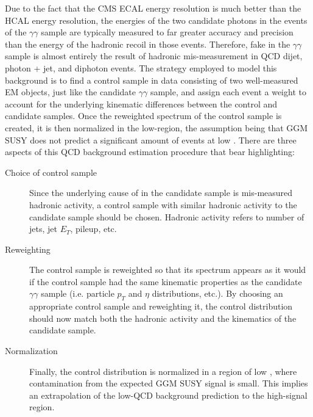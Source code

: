 \documentclass[dissertation_bw.tex]{subfiles}
\begin{document}
Due to the fact that the CMS ECAL energy resolution is much better than the HCAL energy resolution, the energies of the two candidate photons in the events of the $\gamma\gamma$ sample are typically measured to far greater accuracy and precision than the energy of the hadronic recoil in those events.  Therefore, fake \MET in the $\gamma\gamma$ sample is almost entirely the result of hadronic mis-measurement in QCD dijet, photon + jet, and diphoton events.  The strategy employed to model this background is to find a control sample in data consisting of two well-measured EM objects, just like the candidate $\gamma\gamma$ sample, and assign each event a weight to account for the underlying kinematic differences between the control and candidate samples.  Once the reweighted \MET spectrum of the control sample is created, it is then normalized in the low-\MET region, the assumption being that GGM SUSY does not predict a significant amount of events at low \MET.  There are three aspects of this QCD background estimation procedure that bear highlighting:

\begin{description}
\item[Choice of control sample] Since the underlying cause of \MET in the candidate sample is mis-measured hadronic activity, a control sample with similar hadronic activity to the candidate sample should be chosen.  Hadronic activity refers to number of jets, jet $E_{T}$, pileup, etc.
\item[Reweighting] The control sample is reweighted so that its \MET spectrum appears as it would if the control sample had the same kinematic properties as the candidate $\gamma\gamma$ sample (i.e. particle $p_{T}$ and $\eta$ distributions, etc.).  By choosing an appropriate control sample and reweighting it, the control \MET distribution should now match both the hadronic activity and the kinematics of the candidate sample.
\item[Normalization] Finally, the control \MET distribution is normalized in a region of low \MET, where contamination from the expected GGM SUSY signal is small.  This implies an extrapolation of the low-\MET QCD background prediction to the high-\MET signal region.
\end{description}
\end{document}
